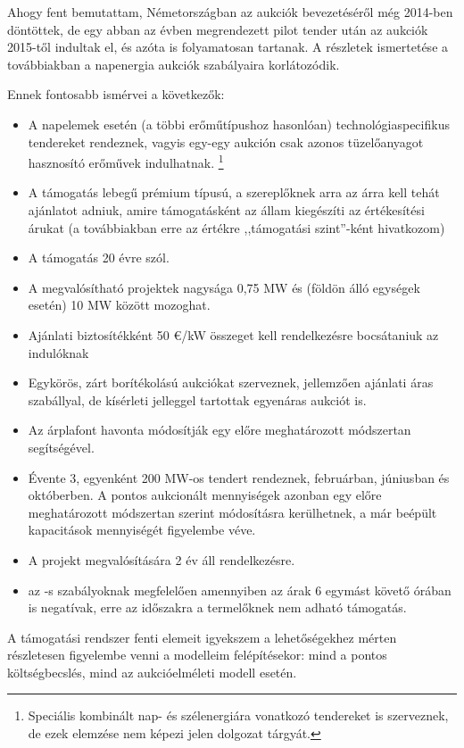 \documentclass[twoside, magyar, showtrims]{corvinusphd}
\begin{document}
Ahogy fent bemutattam, Németországban
az aukciók bevezetéséről még 2014-ben döntöttek,
de egy abban az évben megrendezett pilot tender
után az aukciók 2015-től indultak el,
és azóta is folyamatosan tartanak. A részletek
ismertetése a továbbiakban a napenergia
aukciók szabályaira korlátozódik.

Ennek fontosabb ismérvei a következők:

\begin{itemize}

\item
A napelemek esetén (a többi erőműtípushoz hasonlóan) technológiaspecifikus
tendereket rendeznek, vagyis egy-egy aukción csak azonos tüzelőanyagot
hasznosító erőművek indulhatnak. \footnote{Speciális kombinált nap- és szélenergiára
vonatkozó tendereket is szerveznek, de ezek elemzése nem képezi jelen dolgozat tárgyát.}
\item
A támogatás lebegű prémium típusú, 
a szereplőknek arra az árra kell tehát ajánlatot adniuk, amire támogatásként
az állam kiegészíti az értékesítési árukat (a továbbiakban erre az értékre
,,támogatási szint''-ként hivatkozom)
\item
A támogatás 20 évre szól. 
\item
A megvalósítható projektek nagysága 0,75 MW és (földön álló egységek esetén) 10 MW között mozoghat.
\item
Ajánlati biztosítékként
50 €/kW összeget kell rendelkezésre bocsátaniuk az indulóknak
\item
Egykörös, zárt borítékolású aukciókat szerveznek, jellemzően ajánlati áras szabállyal,
de kísérleti jelleggel tartottak egyenáras aukciót is.
\item
Az árplafont havonta módosítják egy előre meghatározott módszertan segítségével.
\item
Évente 3, egyenként 200 MW-os tendert rendeznek, februárban, júniusban és októberben.
A pontos aukcionált mennyiségek azonban egy előre meghatározott módszertan
szerint módosításra kerülhetnek, a már beépült kapacitások mennyiségét figyelembe véve.
\item
A projekt megvalósítására 2 év áll rendelkezésre.
\item
az -s szabályoknak megfelelően amennyiben az árak
6 egymást követő órában is negatívak, erre az időszakra
a termelőknek nem adható támogatás.
\end{itemize}

A támogatási rendszer fenti elemeit igyekszem
a lehetőségekhez mérten részletesen figyelembe venni
a modelleim felépítésekor: mind a pontos költségbecslés,
mind az aukcióelméleti modell esetén.
\end{document}
